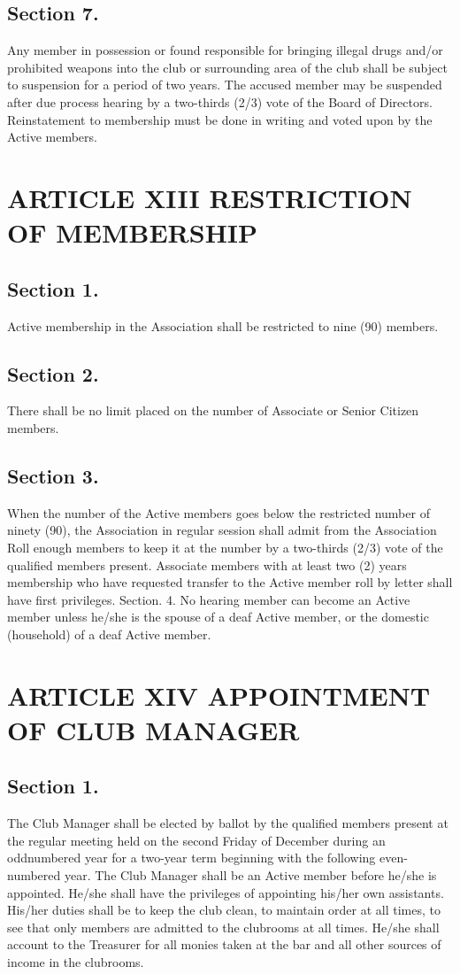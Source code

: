 \documentclass[12pt,letterpaper]{article}
\begin{document}
\subsection*{Section 7.} Any member in possession or found responsible for bringing illegal drugs
and/or prohibited weapons into the club or surrounding area of the club shall be subject
to suspension for a period of two years. The accused member may be suspended after
due process hearing by a two-thirds (2/3) vote of the Board of Directors. Reinstatement
to membership must be done in writing and voted upon by the Active members.

\section*{ARTICLE XIII
RESTRICTION OF MEMBERSHIP}

\subsection*{Section 1.} Active membership in the Association shall be restricted to nine (90)
members.
\subsection*{Section 2.} There shall be no limit placed on the number of Associate or Senior Citizen
members.
\subsection*{Section 3.} When the number of the Active members goes below the restricted number
of ninety (90), the Association in regular session shall admit from the Association Roll
enough members to keep it at the number by a two-thirds (2/3) vote of the qualified
members present. Associate members with at least two (2) years membership who
have requested transfer to the Active member roll by letter shall have first privileges.
Section. 4. No hearing member can become an Active member unless he/she is the
spouse of a deaf Active member, or the domestic (household) of a deaf Active member.

\section*{ARTICLE XIV
APPOINTMENT OF CLUB MANAGER}

\subsection*{Section 1.} The Club Manager shall be elected by ballot by the qualified members
present at the regular meeting held on the second Friday of December during an oddnumbered year for a two-year term beginning with the following even-numbered year.
The Club Manager shall be an Active member before he/she is appointed. He/she shall
have the privileges of appointing his/her own assistants. His/her duties shall be to keep
the club clean, to maintain order at all times, to see that only members are admitted to
the clubrooms at all times. He/she shall account to the Treasurer for all monies taken at
the bar and all other sources of income in the clubrooms.
\end{document}
